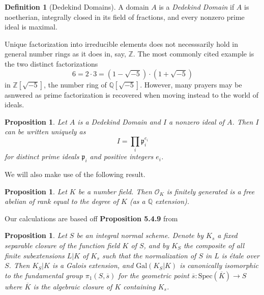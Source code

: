 \documentclass{article}
\theoremstyle{definition}
\newtheorem{definition}[theorem]{Definition}
\theoremstyle{remark}
\theoremstyle{plain}
\newtheorem{proposition}[theorem]{Proposition}
\newcommand{\Z}{\mathbb{Z}}
\newcommand{\Q}{\mathbb{Q}}
\newcommand{\mc}[1]{\mathcal{#1}}
\newcommand{\mk}[1]{\mathfrak{#1}}
\begin{document}
\begin{definition}[Dedekind Domains]
	A domain $A$ is a \textit{Dedekind Domain} if $A$ is noetherian, integrally closed in its field of fractions, and every nonzero prime ideal is maximal.
\end{definition}

Unique factorization into irreducible elements does not necesssarily hold in general number rings as it does in, say, $\Z$.
The most commonly cited example is the two distinct factorizations 
\[6 = 2\cdot3 = (1 - \sqrt{-5})\cdot (1 + \sqrt{-5})\]
in $\Z[\sqrt{-5}]$, the number ring of $\Q[\sqrt{-5}]$.
However, many prayers may be asnwered as prime factorization is recovered when moving instead to the world of ideals.

\begin{proposition}

Let $A$ is a Dedekind Domain and $I$ a nonzero ideal of $A$.
Then $I$ can be written uniquely as 
\[I = \prod_{i} \mk{p}_i^{e_i}\]
for distinct prime ideals $\mk{p}_i$ and positive integers $e_i$.
\end{proposition} 

We will also make use of the following result.
\begin{proposition}
	Let $K$ be a number field.
	Then $\mc{O}_K$ is finitely generated is a free abelian of rank equal to the degree of $K$ (as a $\Q$ extension).
\end{proposition}

Our calculations are based off \textbf{Proposition 5.4.9} from \cite{Szamuely}

\begin{proposition}
	Let $S$ be an integral normal scheme.
	Denote by $K_s$ a fixed separable closure of the function field $K$ of $S$, and by $K_S$ the composite of all finite subextensions $L|K$ of $K_s$ such that the normalization of $S$ in $L$ is \'etale over $S$.
	Then $K_S|K$ is a Galois extension, and $\text{Gal}(K_S|K)$ is canonically isomorphic to the fundamental group $\pi_1(S, \overline{s})$ for the geometric point $\overline{s}: \text{Spec}(\overline{K} ) \to S$ where $\overline{K}$ is the algebraic closure of $K$ containing $K_s$.

\end{proposition}
\end{document}
